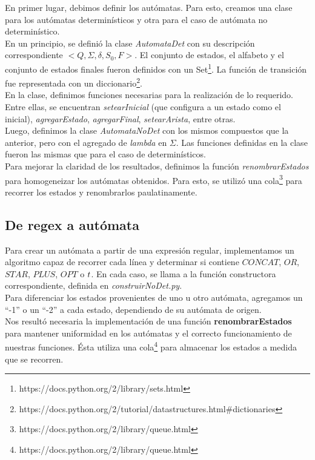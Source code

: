 \documentclass[a4paper, 10pt, twoside]{article}
\begin{document}
En primer lugar, debimos definir los autómatas. Para esto, creamos una clase para los autómatas determinísticos y otra para el caso de autómata no determinístico.\\
\newline
En un principio, se definió la clase \textit{AutomataDet} con su descripción correspondiente $<Q, \Sigma, \delta, S_0, F>$. El conjunto de estados, el alfabeto y el conjunto de estados finales fueron definidos con un Set\footnote{https://docs.python.org/2/library/sets.html}. La función de transición fue representada con un diccionario\footnote{https://docs.python.org/2/tutorial/datastructures.html\#dictionaries}.\\
En la clase, definimos funciones necesarias para la realización de lo requerido. Entre ellas, se encuentran \textit{setearInicial} (que configura a un estado como el inicial), \textit{agregarEstado}, \textit{agregarFinal}, \textit{setearArista}, entre otras.\\
\newline
Luego, definimos la clase \textit{AutomataNoDet} con los mismos compuestos que la anterior, pero con el agregado de \textit{lambda} en $\Sigma$. Las funciones definidas en la clase fueron las mismas que para el caso de determinísticos.\\
\newline
Para mejorar la claridad de los resultados, definimos la función \textit{renombrarEstados} para homogeneizar los autómatas obtenidos. Para esto, se utilizó una cola\footnote{https://docs.python.org/2/library/queue.html} para recorrer los estados y renombrarlos paulatinamente.

\subsection{De regex a autómata}
Para crear un autómata a partir de una expresión regular, implementamos un algoritmo capaz de recorrer cada línea y determinar si contiene ${CONCAT}$, ${OR}$, ${STAR}$, ${PLUS}$, ${OPT}$ o $\\t$. En cada caso, se llama a la función constructora correspondiente, definida en \textit{construirNoDet.py}.\\
\newline
Para diferenciar los estados provenientes de uno u otro autómata, agregamos un ``-1'' o un ``-2'' a cada estado, dependiendo de su autómata de origen.\\
\newline
Nos resultó necesaria la implementación de una función \textbf{renombrarEstados} para mantener uniformidad en los autómatas y el correcto funcionamiento de nuestras funciones. Ésta utiliza una cola\footnote{https://docs.python.org/2/library/queue.html} para almacenar los estados a medida que se recorren.
\end{document}
